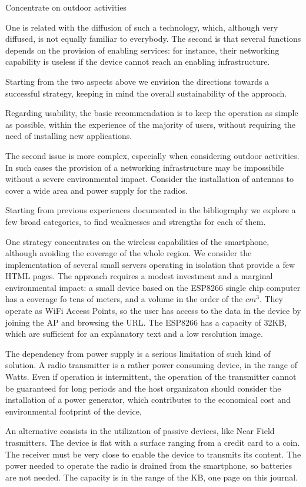 \documentclass[sustainability,article,submit,pdftex,moreauthors]{Definitions/mdpi}
\begin{document}
Concentrate on outdoor activities

One is related with the diffusion of such a technology, which, although very diffused, is not equally familiar to everybody. The second is that several functions depends on the provision of enabling services: for instance, their networking capability is useless if the device cannot reach an enabling infrastructure.

Starting from the two aspects above we envision the directions towards a successful strategy, keeping in mind the overall sustainability of the approach.

Regarding usability, the basic recommendation is to keep the operation as simple as possible, within the experience of the majority of users, without requiring the need of installing new applications.

The second issue is more complex, especially when considering outdoor activities. In such cases the provision of a networking infrastructure may be impossibile without a severe environmental impact. Consider the installation of antennas to cover a wide area and power supply for the radios. 

Starting from previous experiences documented in the bibliography we explore a few broad categories, to find weaknesses and strengths for each of them.

One strategy concentrates on the wireless capabilities of the smartphone, although avoiding the coverage of the whole region. We consider the implementation of several small servers operating in isolation that provide a few HTML pages. The approach requires a modest investment and a marginal environmental impact: a small device based on the ESP8266 single chip computer has a coverage fo tens of meters, and a volume in the order of the $cm^3$. They operate as WiFi Access Points, so the user has access to the data in the device by joining the AP and browsing the URL. The ESP8266 has a capacity of 32KB, which are sufficient for an explanatory text and a low resolution image.

The dependency from power supply is a serious limitation of such kind of solution. A radio transmitter is a rather power consuming device, in the range of Watts. Even if operation is intermittent, the operation of the transmitter cannot be guaranteed for long periods and the host organizaton should consider the installation of a power generator, which contributes to the economical cost and environmental footprint of the device,

An alternative consists in the utilization of passive devices, like Near Field trasmitters. The device is flat with a surface ranging from a credit card to a coin. The receiver must be very close to enable the device to transmits its content. The power needed to operate the radio is drained from the smartphone, so batteries are not needed. The capacity is in the range of the KB, one page on this journal.
\end{document}
